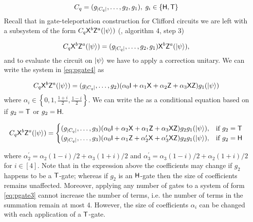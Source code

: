 $$C_q=(g_{|C_q|},\ldots,g_2,g_1 ),\; g_i\in\{{\sf H}, {\sf T}\}$$
Recall that in gate-teleportation construction for Clifford circuits we are left with a subsystem of the form $C_q {\sf X}^b{\sf Z}^a ({\lvert}\psi\rangle)$ (, algorithm 4, step 3)

\begin{equation}
\label{eq:pgate4}
C_q {\sf X}^b{\sf Z}^a ({\lvert}\psi\rangle)=(g_{|C_q|},\ldots,g_2,g_1 ){\sf X}^b{\sf Z}^a ({\lvert}\psi\rangle),
\end{equation}
and to evaluate the circuit on ${\lvert}\psi\rangle$ we have to apply a correction unitary. We can write the system in \ref{eq:pgate4} as

\begin{equation}
\begin{aligned}
\label{eq:pgate5}
C_q {\sf X}^b{\sf Z}^a ({\lvert}\psi\rangle)=(g_{|C_q|},\ldots,g_2)(\alpha_0 {\sf I} +  \alpha_1 {\sf X} + \alpha_2 {\sf Z} + \alpha_3 {\sf X} {\sf Z})g_1 ({\lvert}\psi\rangle)
\end{aligned}
\end{equation}
 where $\alpha_i \in\left\{0,1, \frac{1+i}{2}, \frac{1-i}{2}\right\}.$ We can write the    as a conditional equation based on if $g_2={\sf T}$ or $g_2={\sf H}.$

 \begin{equation}
  C_q {\sf X}^b{\sf Z}^a ({\lvert}\psi\rangle)=
\begin{cases}
  (g_{|C_q|},\ldots,g_3)(\alpha_0 {\sf I} +  \alpha_2 {\sf X} + \alpha_1 {\sf Z} + \alpha_3 {\sf X} {\sf Z})g_2g_1 ({\lvert}\psi\rangle), & \text{if } g_2={\sf T}\\
 (g_{|C_q|},\ldots,g_3)(\alpha_0 {\sf I} +  \alpha_1 {\sf Z} + \alpha_2^\prime {\sf X} + \alpha_3^\prime {\sf X} {\sf Z})g_2g_1 ({\lvert}\psi\rangle), & \text{if } g_2={\sf H}\\
\end{cases}
\end{equation}

where $\alpha_2^\prime=\alpha_2(1-i)/2+\alpha_3(1+i)/2$ and $\alpha_3^\prime=\alpha_3(1-i)/2+\alpha_2(1+i)/2$ for $i\in[4].$ Note that in the expression above the coefficients may change if $g_2$ happens to be a ${\sf T}$-gate;  whereas if $g_2$ is an ${\sf H}$-gate then the size of coefficients remains unaffected. Moreover, applying any number of gates to a system of form \ref{eq:pgate3} cannot increase the number of terms, i.e. the number of terms in the summation remain at most 4. However, the size of coefficients $\alpha_i$ can be changed with each application of a ${\sf T}$-gate.

